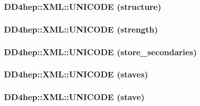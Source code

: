 \label{namespace_d_d4hep_1_1_x_m_l_a828a692e179626778ed33dc45049aa84}
\hypertarget{namespace_d_d4hep_1_1_x_m_l_abf3ada9748fe4fc5e7c446a45425b76a}{
\subsubsection[{UNICODE}]{\setlength{\rightskip}{0pt plus 5cm}DD4hep::XML::UNICODE (structure)}}
\label{namespace_d_d4hep_1_1_x_m_l_abf3ada9748fe4fc5e7c446a45425b76a}
\hypertarget{namespace_d_d4hep_1_1_x_m_l_a51b8b821c7c7382afe7d64ac1e2b6f54}{
\subsubsection[{UNICODE}]{\setlength{\rightskip}{0pt plus 5cm}DD4hep::XML::UNICODE (strength)}}
\label{namespace_d_d4hep_1_1_x_m_l_a51b8b821c7c7382afe7d64ac1e2b6f54}
\hypertarget{namespace_d_d4hep_1_1_x_m_l_a2c01c23fd0b2c71d55c935516e00fb0b}{
\subsubsection[{UNICODE}]{\setlength{\rightskip}{0pt plus 5cm}DD4hep::XML::UNICODE (store\_\-secondaries)}}
\label{namespace_d_d4hep_1_1_x_m_l_a2c01c23fd0b2c71d55c935516e00fb0b}
\hypertarget{namespace_d_d4hep_1_1_x_m_l_a9db672b598862b8117f1440a2ed76526}{
\subsubsection[{UNICODE}]{\setlength{\rightskip}{0pt plus 5cm}DD4hep::XML::UNICODE (staves)}}
\label{namespace_d_d4hep_1_1_x_m_l_a9db672b598862b8117f1440a2ed76526}
\hypertarget{namespace_d_d4hep_1_1_x_m_l_a607e9ca7ddb201b8bd6396f730f46da0}{
\subsubsection[{UNICODE}]{\setlength{\rightskip}{0pt plus 5cm}DD4hep::XML::UNICODE (stave)}}
\label{namespace_d_d4hep_1_1_x_m_l_a607e9ca7ddb201b8bd6396f730f46da0}
